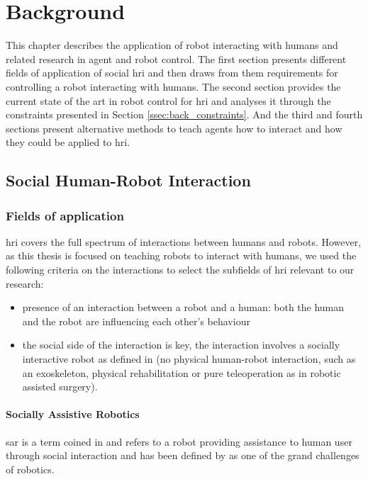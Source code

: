 \chapter{Background} \label{chap:background}

This chapter describes the application of robot interacting with humans and related research in agent and robot control. The first section presents different fields of application of social \gls{hri} and then draws from them requirements for controlling a robot interacting with humans.  The second section provides the current state of the art in robot control for \gls{hri} and analyses it through the constraints presented in Section \ref{ssec:back_constraints}. And the third and fourth sections present alternative methods to teach agents how to interact and how they could be applied to \gls{hri}.

\section{Social Human-Robot Interaction}

\subsection{Fields of application}

\acrlong{hri} covers the full spectrum of interactions between humans and robots. However, as this thesis is focused on teaching robots to interact with humans, we used the following criteria on the interactions to select the subfields of \gls{hri} relevant to our research:
\begin{itemize}
\item presence of an interaction between a robot and a human: both the human and the robot are influencing each other's behaviour
\item the social side of the interaction is key, the interaction involves a socially interactive robot as defined in \citet{Fong2003} (no physical human-robot interaction, such as an exoskeleton, physical rehabilitation or pure teleoperation as in robotic assisted surgery).
\end{itemize}

\subsubsection{Socially Assistive Robotics}

	\gls{sar} is a term coined in \cite{feil2005defining} and refers to a robot providing assistance to human user through social interaction and has been defined by \cite{tapus2007socially} as one of the grand challenges of robotics.
	
